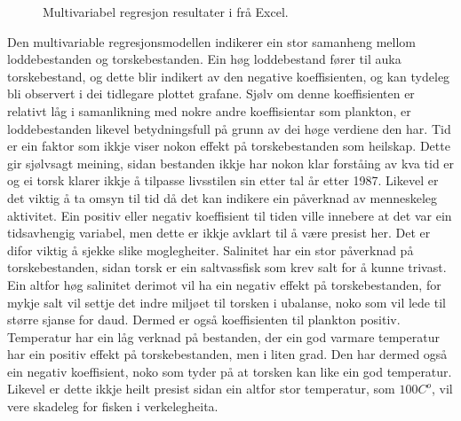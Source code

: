 \documentclass{report}
\begin{document}
\begin{figure}[H]
	\centering
	\caption{Multivariabel regresjon resultater i frå Excel.}
	\label{Multi}
\end{figure}
Den multivariable regresjonsmodellen indikerer ein stor samanheng mellom loddebestanden og torskebestanden. Ein høg loddebestand fører til auka torskebestand, og dette blir indikert av den negative koeffisienten, og kan tydeleg bli observert i dei tidlegare plottet grafane. Sjølv om denne koeffisienten er relativt låg i samanlikning med nokre andre koeffisientar som plankton, er loddebestanden likevel betydningsfull på grunn av dei høge verdiene den har.
Tid er ein faktor som ikkje viser nokon effekt på torskebestanden som heilskap. Dette gir sjølvsagt meining, sidan bestanden ikkje har nokon klar forståing av kva tid er og ei torsk klarer ikkje å tilpasse livsstilen sin etter tal år etter 1987. Likevel er det viktig å ta omsyn til tid då det kan indikere ein påverknad av menneskeleg aktivitet. Ein positiv eller negativ koeffisient til tiden ville innebere at det var ein tidsavhengig variabel, men dette er ikkje avklart til å være presist her. Det er difor viktig å sjekke slike moglegheiter.
Salinitet har ein stor påverknad på torskebestanden, sidan torsk er ein saltvassfisk som krev salt for å kunne trivast.
Ein altfor høg salinitet derimot vil ha ein negativ effekt på torskebestanden, for mykje salt vil settje det indre miljøet til torsken i ubalanse, noko som vil lede til større sjanse for daud.
Dermed er også koeffisienten til plankton positiv. Temperatur har ein låg verknad på bestanden, der ein god varmare temperatur har ein positiv effekt på torskebestanden, men i liten grad. Den har dermed også ein negativ koeffisient, noko som tyder på at torsken kan like ein god temperatur. Likevel er dette ikkje heilt presist sidan ein altfor stor temperatur, som $100C^o$, vil vere skadeleg for fisken i verkelegheita.
\end{document}
